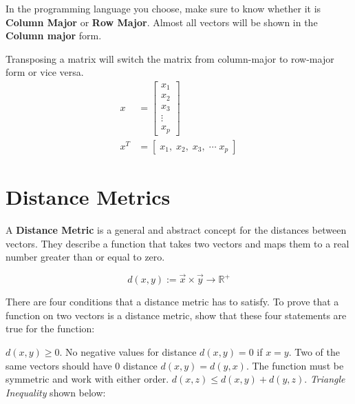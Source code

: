 In the programming language you choose, make sure to know whether it is \textbf{Column Major} or \textbf{Row Major}. Almost all vectors will be shown in the \textbf{Column major} form.


Transposing a matrix will switch the matrix from column-major to row-major form or vice versa.
  \begin{align*}
    x &= \begin{bmatrix}
           x_{1} \\
           x_{2} \\
           x_{3} \\
           \vdots \\
           x_{p}
         \end{bmatrix} \\
    x^T &= [\; x_1, \; x_2, \; x_3, \; \cdots \; x_p \;]
  \end{align*}



\section{Distance Metrics}
A \textbf{Distance Metric} is a general and abstract concept for the distances between vectors. They describe a function that takes two vectors and maps them to a real number greater than or equal to zero. 

\[
    d(x,y):= \vec{x} \times \vec{y} \rightarrow \mathbb{R}^+
\]

There are four conditions that a distance metric has to satisfy. To prove that a function on two vectors is a distance metric, show that these four statements are true for the function:

\begin{outline}
    \1 $d(x, y) \ge 0$. \; No negative values for distance
    \1 $d(x,y) = 0$ if $x = y$. \; Two of the same vectors should have 0 distance
    \1 $d(x,y) = d(y,x)$. \; The function must be symmetric and work with either order.
    \1 $d(x,z) \le d(x,y) + d(y,z)$. \; \textit{Triangle Inequality} shown below:
\end{outline}

\begin{center}
\end{center}

